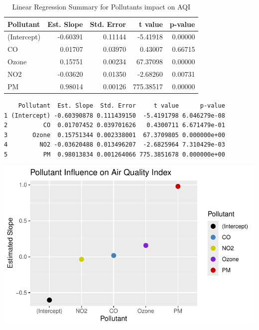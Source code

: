 \documentclass[
  letterpaper,
  DIV=11,
  numbers=noendperiod]{scrartcl}
\begin{document}
\begin{longtable}[t]{lrrrr}
\caption{Linear Regression Summary for Pollutants impact on AQI}\\
\toprule
Pollutant & Est. Slope & Std. Error & t value & p-value\\
\midrule
(Intercept) & -0.60391 & 0.11144 & -5.41918 & 0.00000\\
CO & 0.01707 & 0.03970 & 0.43007 & 0.66715\\
Ozone & 0.15751 & 0.00234 & 67.37098 & 0.00000\\
NO2 & -0.03620 & 0.01350 & -2.68260 & 0.00731\\
PM & 0.98014 & 0.00126 & 775.38517 & 0.00000\\
\bottomrule
\end{longtable}

\begin{verbatim}
    Pollutant  Est. Slope  Std. Error     t value      p-value
1 (Intercept) -0.60390878 0.111439150  -5.4191798 6.046279e-08
2          CO  0.01707452 0.039701626   0.4300711 6.671479e-01
3       Ozone  0.15751344 0.002338001  67.3709805 0.000000e+00
4         NO2 -0.03620488 0.013496207  -2.6825964 7.310429e-03
5          PM  0.98013834 0.001264066 775.3851678 0.000000e+00
\end{verbatim}

\includegraphics{FinalProject_files/figure-pdf/unnamed-chunk-2-1.pdf}
\end{document}
